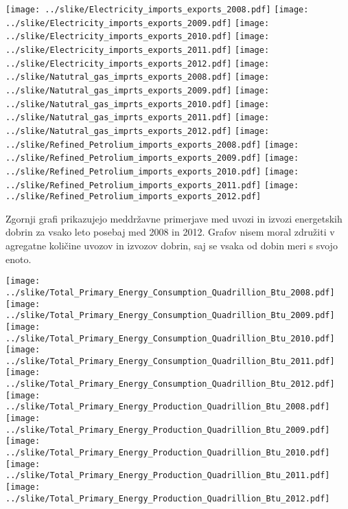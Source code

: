 \documentclass[11pt,a4paper]{article}
\begin{document}
\texttt{[image: ../slike/Electricity\_imports\_exports\_2008.pdf]}
\texttt{[image: ../slike/Electricity\_imports\_exports\_2009.pdf]}
\texttt{[image: ../slike/Electricity\_imports\_exports\_2010.pdf]}
\texttt{[image: ../slike/Electricity\_imports\_exports\_2011.pdf]}
\texttt{[image: ../slike/Electricity\_imports\_exports\_2012.pdf]}
\texttt{[image: ../slike/Natutral\_gas\_imprts\_exports\_2008.pdf]}
\texttt{[image: ../slike/Natutral\_gas\_imprts\_exports\_2009.pdf]}
\texttt{[image: ../slike/Natutral\_gas\_imprts\_exports\_2010.pdf]}
\texttt{[image: ../slike/Natutral\_gas\_imprts\_exports\_2011.pdf]}
\texttt{[image: ../slike/Natutral\_gas\_imprts\_exports\_2012.pdf]}
\texttt{[image: ../slike/Refined\_Petrolium\_imports\_exports\_2008.pdf]}
\texttt{[image: ../slike/Refined\_Petrolium\_imports\_exports\_2009.pdf]}
\texttt{[image: ../slike/Refined\_Petrolium\_imports\_exports\_2010.pdf]}
\texttt{[image: ../slike/Refined\_Petrolium\_imports\_exports\_2011.pdf]}
\texttt{[image: ../slike/Refined\_Petrolium\_imports\_exports\_2012.pdf]}

Zgornji grafi prikazujejo meddržavne primerjave med uvozi in izvozi energetskih dobrin za vsako leto posebaj med 2008 in 2012. Grafov nisem moral združiti v agregatne količine uvozov in izvozov dobrin, saj se vsaka od dobin meri s svojo enoto.

\texttt{[image: ../slike/Total\_Primary\_Energy\_Consumption\_Quadrillion\_Btu\_2008.pdf]}
\texttt{[image: ../slike/Total\_Primary\_Energy\_Consumption\_Quadrillion\_Btu\_2009.pdf]}
\texttt{[image: ../slike/Total\_Primary\_Energy\_Consumption\_Quadrillion\_Btu\_2010.pdf]}
\texttt{[image: ../slike/Total\_Primary\_Energy\_Consumption\_Quadrillion\_Btu\_2011.pdf]}
\texttt{[image: ../slike/Total\_Primary\_Energy\_Consumption\_Quadrillion\_Btu\_2012.pdf]}
\texttt{[image: ../slike/Total\_Primary\_Energy\_Production\_Quadrillion\_Btu\_2008.pdf]}
\texttt{[image: ../slike/Total\_Primary\_Energy\_Production\_Quadrillion\_Btu\_2009.pdf]}
\texttt{[image: ../slike/Total\_Primary\_Energy\_Production\_Quadrillion\_Btu\_2010.pdf]}
\texttt{[image: ../slike/Total\_Primary\_Energy\_Production\_Quadrillion\_Btu\_2011.pdf]}
\texttt{[image: ../slike/Total\_Primary\_Energy\_Production\_Quadrillion\_Btu\_2012.pdf]}
\end{document}
